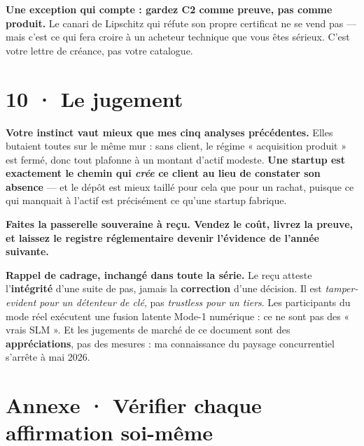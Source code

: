 \documentclass[10pt]{article}
\begin{document}
\begin{piste}
\textbf{Une exception qui compte : gardez C2 comme preuve, pas comme produit.} Le canari de Lipschitz
qui réfute son propre certificat ne se vend pas --- mais c'est ce qui fera croire à un acheteur
technique que vous êtes sérieux. C'est votre lettre de créance, pas votre catalogue.
\end{piste}

\section{10 · Le jugement}

\begin{acquis}
\textbf{Votre instinct vaut mieux que mes cinq analyses précédentes.} Elles butaient toutes sur le
même mur : sans client, le régime « acquisition produit » est fermé, donc tout plafonne à un montant
d'actif modeste. \textbf{Une startup est exactement le chemin qui \emph{crée} ce client au lieu de
constater son absence} --- et le dépôt est mieux taillé pour cela que pour un rachat, puisque ce qui
manquait à l'actif est précisément ce qu'une startup fabrique.
\end{acquis}

\textbf{Faites la passerelle souveraine à reçu. Vendez le coût, livrez la preuve, et laissez le
registre réglementaire devenir l'évidence de l'année suivante.}

\begin{these}
\small\textbf{Rappel de cadrage, inchangé dans toute la série.} Le reçu atteste l'\textbf{intégrité}
d'une suite de pas, jamais la \textbf{correction} d'une décision. Il est \emph{tamper-evident pour un
détenteur de clé}, pas \emph{trustless pour un tiers}. Les participants du mode réel exécutent une
fusion latente Mode-1 numérique : ce ne sont pas des « vrais SLM ». Et les jugements de marché de ce
document sont des \textbf{appréciations}, pas des mesures : ma connaissance du paysage concurrentiel
s'arrête à mai 2026.
\end{these}

\section{Annexe · Vérifier chaque affirmation soi-même}
\end{document}
